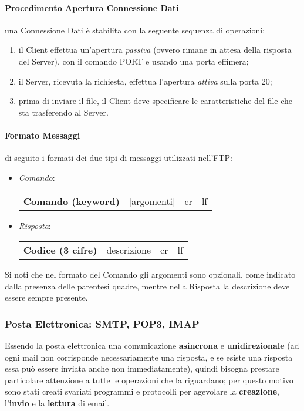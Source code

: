 \documentclass[a4paper]{article}
\begin{document}
			
			\paragraph{Procedimento Apertura Connessione Dati}
				una Connessione Dati è stabilita con la seguente sequenza di operazioni:
				\begin{enumerate}
					\item il Client effettua un'apertura \emph{passiva} (ovvero rimane in attesa della risposta del Server), con il comando PORT e usando una porta effimera;
					\item il Server, ricevuta la richiesta, effettua l'apertura \emph{attiva} sulla porta 20;
					\item prima di inviare il file, il Client deve specificare le caratteristiche del file che sta trasferendo al Server.
				\end{enumerate}				
				
				
			\paragraph{Formato Messaggi}
				di seguito i formati dei due tipi di messaggi utilizzati nell'FTP:
				\begin{itemize}
					\item \emph{Comando}:
					\begin{tabular}{cccc}
									\textbf{Comando (keyword)} & [argomenti] & cr & lf\\
					\end{tabular}
					\item \emph{Risposta}:
					\begin{tabular}{cccc}
									\textbf{Codice (3 cifre)} & descrizione & cr & lf\\
					\end{tabular}
				\end{itemize}
				
				Si noti che nel formato del Comando gli argomenti sono opzionali, come indicato dalla presenza delle parentesi quadre, mentre nella Risposta la descrizione deve essere sempre presente.
	
			\newpage
		
		
		\subsubsection{Posta Elettronica: SMTP, POP3, IMAP}
		
				Essendo la posta elettronica una comunicazione \textbf{asincrona} e \textbf{unidirezionale} (ad ogni mail non corrisponde necessariamente una risposta, e se esiste una risposta essa può essere inviata anche non immediatamente), quindi bisogna prestare particolare attenzione a tutte le operazioni che la riguardano; per questo motivo sono stati creati svariati programmi e protocolli per agevolare la \textbf{creazione}, l'\textbf{invio} e la \textbf{lettura} di email.
				
\end{document}
